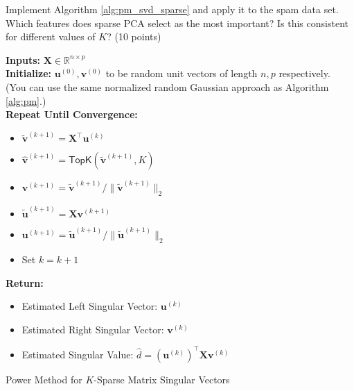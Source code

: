 \documentclass[10pt]{article}
\newcommand{\R}{\mathbb{R}}
\newcommand{\bX}{\bm{X}}
\newcommand{\bv}{\bm{v}}
\newcommand{\bu}{\bm{u}}
\begin{document}
\begin{itemize}
Implement Algorithm \ref{alg:pm_svd_sparse} and apply it to the spam data set. Which features does sparse PCA select as the most important? Is this consistent for different values of $K$? (10 points)
\begin{algorithm}
\textbf{Inputs:} $\bX \in \R^{n \times p}$\\
\textbf{Initialize:} $\bu^{(0)}, \bv^{(0)}$ to be  random unit vectors of length $n, p$ respectively.\\\phantom{initialize: a} (You can use the same normalized random Gaussian approach as Algorithm \ref{alg:pm}.)\\
\textbf{Repeat Until Convergence:}
\begin{itemize}
    \item $\tilde{\bv}^{(k+1)} = \bX^{\top} \bu^{(k)}$
    \item $\hat{\bv}^{(k+1)} = \textsf{TopK}(\tilde{\bv}^{(k+1)}, K)$
    \item $\bv^{(k+1)} = \tilde{\bv}^{(k+1)} / \|\tilde{\bv}^{(k+1)}\|_2$
    \item $\tilde{\bu}^{(k+1)} = \bX \bv^{(k+1)}$
    \item $\bu^{(k+1)} = \tilde{\bu}^{(k+1)} / \|\tilde{\bu}^{(k+1)}\|_2$
    \item Set $k = k + 1$
\end{itemize}
\textbf{Return:}
\begin{itemize}
    \item Estimated Left Singular Vector: $\bu^{(k)}$
    \item Estimated Right Singular Vector: $\bv^{(k)}$
    \item Estimated Singular Value: $\hat{d} = (\bu^{(k)})^{\top}\bX\bv^{(k)}$
\end{itemize}
    \caption{Power Method for $K$-Sparse Matrix Singular Vectors}
    \label{alg:pm_svd_sparse}
\end{algorithm} 
\end{itemize}
\end{document}
